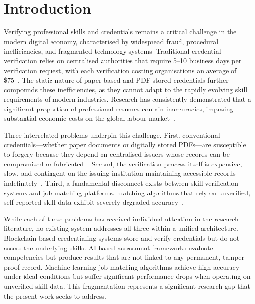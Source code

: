 
\section{Introduction}
\label{sec:Introduction}

Verifying professional skills and credentials remains a critical challenge in the modern digital economy, characterised by widespread fraud, procedural inefficiencies, and fragmented technology systems. Traditional credential verification relies on centralised authorities that require 5--10 business days per verification request, with each verification costing organisations an average of \$75~\citep{Patel2024}. The static nature of paper-based and PDF-stored credentials further compounds these inefficiencies, as they cannot adapt to the rapidly evolving skill requirements of modern industries. Research has consistently demonstrated that a significant proportion of professional resumes contain inaccuracies, imposing substantial economic costs on the global labour market~\citep{Kisi2022}.

Three interrelated problems underpin this challenge. First, conventional credentials---whether paper documents or digitally stored PDFs---are susceptible to forgery because they depend on centralised issuers whose records can be compromised or fabricated~\citep{Cardenas2025}. Second, the verification process itself is expensive, slow, and contingent on the issuing institution maintaining accessible records indefinitely~\citep{Hemairy2024}. Third, a fundamental disconnect exists between skill verification systems and job matching platforms: matching algorithms that rely on unverified, self-reported skill data exhibit severely degraded accuracy~\citep{Qin2020}.

While each of these problems has received individual attention in the research literature, no existing system addresses all three within a unified architecture. Blockchain-based credentialing systems store and verify credentials but do not assess the underlying skills. AI-based assessment frameworks evaluate competencies but produce results that are not linked to any permanent, tamper-proof record. Machine learning job matching algorithms achieve high accuracy under ideal conditions but suffer significant performance drops when operating on unverified skill data. This fragmentation represents a significant research gap that the present work seeks to address.

